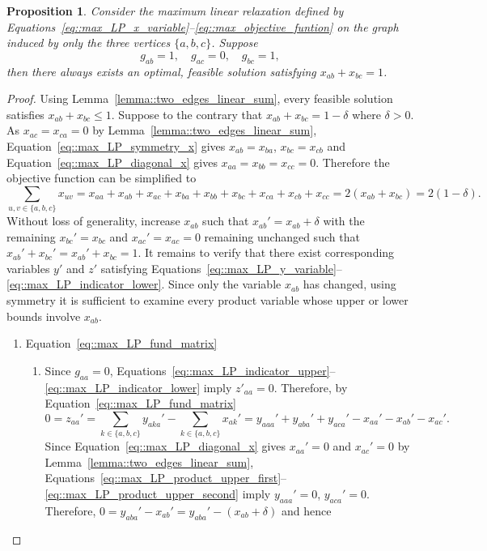 \documentclass[11pt]{article}
\newtheorem{proposition}{Proposition}
\begin{document}
\begin{proposition} \label{prop::local_two_edges_augmentation}
  Consider the maximum linear relaxation defined by Equations~\eqref{eq::max_LP_x_variable}--\eqref{eq::max_objective_funtion} on the graph induced by only the three vertices $\{a,b,c\}$. Suppose
  \[
  g_{ab}=1,\quad g_{ac}=0, \quad g_{bc}=1,
  \]
  then there always exists an optimal, feasible solution satisfying $x_{ab}+x_{bc}=1$.
\end{proposition}
\begin{proof}
  Using Lemma~\ref{lemma::two_edges_linear_sum}, every feasible solution satisfies $x_{ab}+x_{bc} \leq 1$. Suppose to the contrary that $x_{ab}+x_{bc} = 1 - \delta$ where $ \delta > 0$. As $x_{ac}=x_{ca}=0$ by Lemma~\ref{lemma::two_edges_linear_sum}, Equation~\eqref{eq::max_LP_symmetry_x} gives $x_{ab}=x_{ba}$, 
  $x_{bc}=x_{cb}$ and Equation~\eqref{eq::max_LP_diagonal_x} gives $x_{aa}=x_{bb}=x_{cc}=0$. Therefore the objective function can be simplified to 
  \[
  \sum_{u,v \in \{a,b,c\}}x_{uv} = x_{aa}+x_{ab}+x_{ac}+x_{ba}+x_{bb}+x_{bc}+x_{ca}+x_{cb}+x_{cc} = 2(x_{ab}+x_{bc}) = 2(1 - \delta). 
  \]
  Without loss of generality, increase $x_{ab}$ such that $x_{ab}'=x_{ab}+\delta$ with the remaining $x_{bc}'=x_{bc}$ and $x_{ac}' = x_{ac} = 0$ remaining unchanged such that $x_{ab}'+x_{bc}'=x_{ab}'+x_{bc}=1$. It remains to verify that there exist corresponding variables $y'$ and $z'$ satisfying Equations~\eqref{eq::max_LP_y_variable}--\eqref{eq::max_LP_indicator_lower}. Since only the variable $x_{ab}$ has changed, using symmetry it is sufficient to examine every product variable whose upper or lower bounds involve $x_{ab}$. 
  \begin{enumerate}[label=\Alph*.]
    \item Equation~\eqref{eq::max_LP_fund_matrix}
      \begin{enumerate}[label=(\roman*)]
        \item Since $g_{aa} = 0$, Equations~\eqref{eq::max_LP_indicator_upper}--\eqref{eq::max_LP_indicator_lower} imply $z'_{aa} = 0$. Therefore, by     Equation~\eqref{eq::max_LP_fund_matrix}
          \[
          0 = z_{aa}' = \sum_{k\in\{a,b,c\}}y_{aka}' -\sum_{k\in\{a,b,c\}}x_{ak}' = y_{aaa}'+y_{aba}'+y_{aca}' -x_{aa}'-x_{ab}'-x_{ac}'.
          \]
          Since Equation~\eqref{eq::max_LP_diagonal_x} gives $x_{aa}'=0$ and $x_{ac}'=0$ by Lemma~\ref{lemma::two_edges_linear_sum}, Equations~\eqref{eq::max_LP_product_upper_first}--\eqref{eq::max_LP_product_upper_second} imply $y_{aaa}'=0$, $y_{aca}'=0$. Therefore, $0 = y_{aba}'-x_{ab}' = y_{aba}'-(x_{ab}+\delta)$ and hence 

\end{enumerate}
\end{enumerate}
\end{proof}
\end{document}
